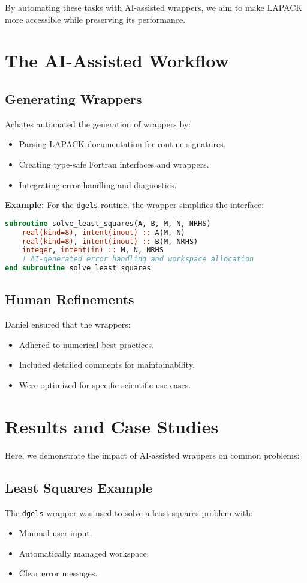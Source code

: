 \documentclass[11pt]{article}
\begin{document}
By automating these tasks with AI-assisted wrappers, we aim to make LAPACK more accessible while preserving its performance.

\section{The AI-Assisted Workflow}
\subsection{Generating Wrappers}
Achates automated the generation of wrappers by:
\begin{itemize}
    \item Parsing LAPACK documentation for routine signatures.
    \item Creating type-safe Fortran interfaces and wrappers.
    \item Integrating error handling and diagnostics.
\end{itemize}

\textbf{Example:} For the \texttt{dgels} routine, the wrapper simplifies the interface:
\begin{lstlisting}[language=Fortran, caption={AI-Generated Wrapper for LAPACK \texttt{dgels}}]
subroutine solve_least_squares(A, B, M, N, NRHS)
    real(kind=8), intent(inout) :: A(M, N)
    real(kind=8), intent(inout) :: B(M, NRHS)
    integer, intent(in) :: M, N, NRHS
    ! AI-generated error handling and workspace allocation
end subroutine solve_least_squares
\end{lstlisting}

\subsection{Human Refinements}
Daniel ensured that the wrappers:
\begin{itemize}
    \item Adhered to numerical best practices.
    \item Included detailed comments for maintainability.
    \item Were optimized for specific scientific use cases.
\end{itemize}

\section{Results and Case Studies}
Here, we demonstrate the impact of AI-assisted wrappers on common problems:
\subsection{Least Squares Example}
The \texttt{dgels} wrapper was used to solve a least squares problem with:
\begin{itemize}
    \item Minimal user input.
    \item Automatically managed workspace.
    \item Clear error messages.
\end{itemize}
\end{document}
